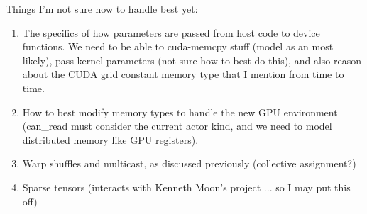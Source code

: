 \filbreak
{}

Things I'm not sure how to handle best yet:

\begin{enumerate}
  \item The specifics of how parameters are passed from host code to device functions.
  We need to be able to cuda-memcpy stuff (model as an  most likely), pass kernel parameters (not sure how to best do this), and also reason about the CUDA grid constant memory type that I mention from time to time.
  \filbreak
  \item How to best modify memory types to handle the new GPU environment (can\_read must consider the current actor kind, and we need to model distributed memory like GPU registers).
  \filbreak
  \item Warp shuffles and multicast, as discussed previously (collective assignment?)
  \item Sparse tensors (interacts with Kenneth Moon's project ... so I may put this off)
\end{enumerate}



